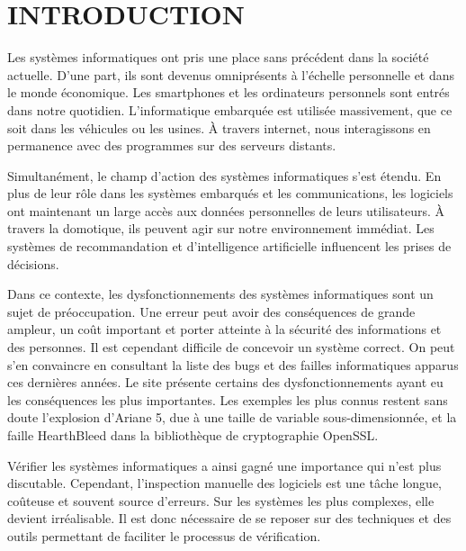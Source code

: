 
\chapter{INTRODUCTION}\label{sec:Introduction}  %

Les systèmes informatiques ont pris une place sans précédent dans la société
actuelle. D'une part, ils sont devenus omniprésents à l'échelle personnelle et
dans le monde économique. Les smartphones et les ordinateurs personnels sont
entrés dans notre quotidien. L'informatique embarquée est utilisée massivement,
que ce soit dans les véhicules ou les usines. À travers internet, nous
interagissons en permanence avec des programmes sur des serveurs distants.

Simultanément, le champ d'action des systèmes informatiques s'est étendu. En
plus de leur rôle dans les systèmes embarqués et les communications, les
logiciels ont maintenant un large accès aux données personnelles de leurs
utilisateurs. À travers la domotique, ils peuvent agir sur notre environnement
immédiat. Les systèmes de recommandation et d'intelligence artificielle
influencent les prises de décisions.

Dans ce contexte, les dysfonctionnements des systèmes informatiques sont un
sujet de préoccupation. Une erreur peut avoir des conséquences de grande
ampleur, un coût important et porter atteinte à la sécurité des informations et
des personnes. Il est cependant difficile de concevoir un système correct. On
peut s'en convaincre en consultant la liste des bugs et des failles
informatiques apparus ces dernières années. Le site \cite{horror_story} présente
certains des dysfonctionnements ayant eu les conséquences les plus importantes.
Les exemples les plus connus restent sans doute l'explosion d'Ariane 5, due à
une taille de variable sous-dimensionnée, et la faille HearthBleed dans la
bibliothèque de cryptographie OpenSSL.

Vérifier les systèmes informatiques a ainsi gagné une importance qui n'est
plus discutable. Cependant, l'inspection manuelle des logiciels est une
tâche longue, coûteuse et souvent source d'erreurs. Sur les systèmes les
plus complexes, elle devient irréalisable. Il est donc nécessaire de se
reposer sur des techniques et des outils permettant de faciliter
le processus de vérification.

